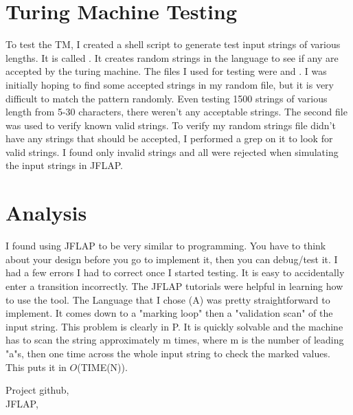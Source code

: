\documentclass{article}
\begin{document}
\section{Turing Machine Testing}
To test the TM, I created a shell script to generate test input strings of various lengths. It is called . It creates random strings in the language to see if any are accepted by the turing machine. The files I used for testing were  and . I was initially hoping to find some accepted strings in my random file, but it is very difficult to match the pattern randomly. Even testing 1500 strings of various length from 5-30 characters, there weren't any acceptable strings. The second file  was used to verify known valid strings. To verify my random strings file didn't have any strings that should be accepted, I performed a grep on it to look for valid strings. I found only invalid strings and all were rejected when simulating the input strings in JFLAP.

\section{Analysis}
I found using JFLAP to be very similar to programming. You have to think about your design before you go to implement it, then you can debug/test it. I had a few errors I had to correct once I started testing. It is easy to accidentally enter a transition incorrectly. The JFLAP tutorials were helpful in learning how to use the tool. The Language that I chose (A) was pretty straightforward to implement. It comes down to a "marking loop" then a "validation scan" of the input string. This problem is clearly in P. It is quickly solvable and the machine has to scan the string approximately m times, where m is the number of leading "a"s, then one time across the whole input string to check the marked values. This puts it in ${O}$(TIME(N)). 

\begin{thebibliography}{9}
Project github, \\
JFLAP, \\
\end{thebibliography}
\end{document}
